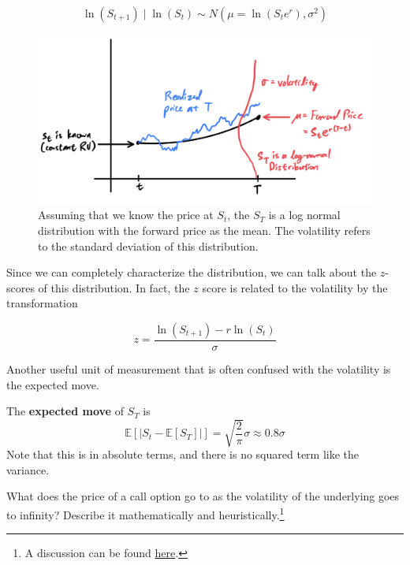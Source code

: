 \documentclass{article}
\begin{document}
    \begin{equation}
      \ln(S_{t + 1}) \mid \ln(S_t) \sim N(\mu = \ln(S_t e^r), \sigma^2)
    \end{equation}

    \begin{figure}[H]
      \centering 
      \includegraphics[scale=0.5]{img/distribution_of_S_T.png}
      \caption{Assuming that we know the price at $S_t$, the $S_T$ is a log normal distribution with the forward price as the mean. The volatility refers to the standard deviation of this distribution. } 
      \label{fig:distribution_of_S_T}
    \end{figure}

    Since we can completely characterize the distribution, we can talk about the $z$-scores of this distribution. In fact, the $z$ score is related to the volatility by the transformation 

    \begin{equation}
      z = \frac{\ln(S_{t + 1}) - r \ln(S_t)}{\sigma}
    \end{equation}

    Another useful unit of measurement that is often confused with the volatility is the expected move. 

    \begin{definition}
      The \textbf{expected move} of $S_T$ is 
      \begin{equation}
        \mathbb{E}[|S_t - \mathbb{E}[S_T]|] = \sqrt{\frac{2}{\pi}} \sigma \approx 0.8 \sigma
      \end{equation}
      Note that this is in absolute terms, and there is no squared term like the variance. 
    \end{definition}

    \begin{exercise}
      What does the price of a call option go to as the volatility of the underlying goes to infinity? Describe it mathematically and heuristically.\footnote{A discussion can be found \href{https://quant.stackexchange.com/questions/39490/value-of-call-option-as-volatility-goes-to-infinity}{here}. } 
    \end{exercise}
\end{document}
